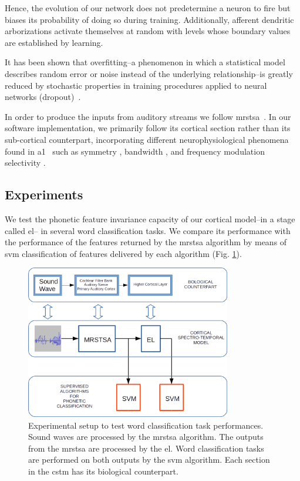 \documentclass[10pt,letterpaper]{article}
\begin{document}
Hence, the evolution of our network does not predetermine a neuron to fire but biases its probability of doing so during training. Additionally, afferent dendritic arborizations activate themselves at random with levels whose boundary values are established by learning. 

It has been shown that overfitting--a phenomenon in which a statistical model describes random error or noise instead of the underlying relationship--is greatly reduced by stochastic properties in training procedures applied to neural networks (dropout)~\cite{JMLR:v15:srivastava14a}.

In order to produce the inputs from auditory streams we follow  \gls{mrstsa}~\cite{chi_2005}. In our software implementation, we primarily follow its cortical section rather than its sub-cortical counterpart, incorporating different neurophysiological phenomena found in \gls{a1}~\cite{wang_1995} such as symmetry \cite{shamma_1993}, bandwidth \cite{schreiner_1990}, and frequency modulation selectivity \cite{shamma_1993,heil_1992,mendelson_1985}.

\subsection*{Experiments}

We test the phonetic feature invariance capacity of our cortical model--in a stage called \gls{el}-- 
in several word classification tasks. We compare its performance with the performance of the features returned by the \gls{mrstsa} algorithm by means of \gls{svm} classification of features delivered by each algorithm (Fig. \ref{fig:Experiment}).

\begin{figure}[h!]
    \centering
    \includegraphics[width=0.8\textwidth]{Experiment.png}
    \caption{Experimental setup to test word classification task performances.
    Sound waves are processed by the \gls{mrstsa} algorithm.
    The outputs from the \gls{mrstsa} are processed by the \gls{el}.
    Word classification tasks are performed on both outputs by the \gls{svm} algorithm.
    Each section in the \gls{cstm} has its biological counterpart.}
    \label{fig:Experiment}
\end{figure}
\end{document}
